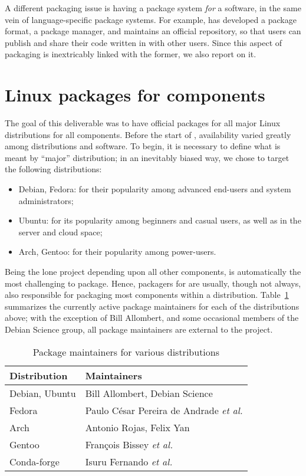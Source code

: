 \documentclass{deliverablereport}
\begin{document}
A different packaging issue is having a package system \emph{for} a
\ODK software, in the same vein of language-specific package
systems. %
For example, \GAP has developed a package format, a package manager,
and maintains an official repository, so that users can publish and
share their code written in \GAP with other users. %
Since this aspect of packaging is inextricably linked with the former,
we also report on it.


\section{Linux packages for \ODK components}

The goal of this deliverable was to have official packages for all
major Linux distributions for all \ODK components. %
Before the start of \ODK, availability varied greatly among
distributions and software. %
To begin, it is necessary to define what is meant by ``major''
distribution; in an inevitably biased way, we chose to target the
following distributions:

\begin{itemize}
\item Debian, Fedora: for their popularity among advanced end-users
  and system administrators;
\item Ubuntu: for its popularity among beginners and casual users, as well as
  in the server and cloud space;
\item Arch, Gentoo: for their popularity among power-users.
\end{itemize}

Being the lone project depending upon all other \ODK components, \Sage
is automatically the most challenging to package. %
Hence, packagers for \Sage are usually, though not always, also
responsible for packaging most \ODK components within a
distribution. %
Table~\ref{tab:maintainers} summarizes the currently active package
maintainers for each of the distributions above; with the exception of
Bill Allombert, and some occasional members of the Debian Science
group, all package maintainers are external to the \ODK project.

\begin{table}
  \centering
  \begin{tabular}{p{} | p{}}
    Distribution & Maintainers\\
    \hline
    Debian, Ubuntu & Bill Allombert, Debian Science\\
    Fedora & Paulo César Pereira de Andrade \emph{et al.}\\
    Arch & Antonio Rojas, Felix Yan\\
    Gentoo & François Bissey \emph{et al.}\\
    Conda-forge & Isuru Fernando \emph{et al.}
  \end{tabular}
  \caption{Package maintainers for various distributions}
  \label{tab:maintainers}
\end{table}
\end{document}

